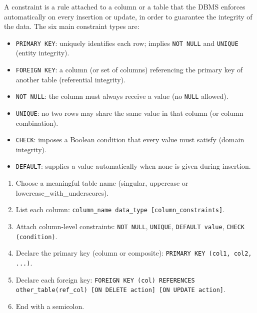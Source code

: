 \documentclass[11pt]{article}
\newcommand{\cle}[1]{{\popxbold\color{popdark}#1}}
\begin{document}
\begin{definition}[Constraint]
A \cle{constraint} is a rule attached to a column or a table that the DBMS enforces automatically on every insertion or update, in order to guarantee the integrity of the data. The six main constraint types are:
\begin{itemize}
\item \texttt{PRIMARY KEY}: uniquely identifies each row; implies \texttt{NOT NULL} and \texttt{UNIQUE} (entity integrity).
\item \texttt{FOREIGN KEY}: a column (or set of columns) referencing the primary key of another table (referential integrity).
\item \texttt{NOT NULL}: the column must always receive a value (no \texttt{NULL} allowed).
\item \texttt{UNIQUE}: no two rows may share the same value in that column (or column combination).
\item \texttt{CHECK}: imposes a Boolean condition that every value must satisfy (domain integrity).
\item \texttt{DEFAULT}: supplies a value automatically when none is given during insertion.
\end{itemize}
\end{definition}

\begin{methode}
\begin{enumerate}
\item Choose a meaningful table name (singular, uppercase or lowercase\_with\_underscores).
\item List each column: \texttt{column\_name data\_type [column\_constraints]}.
\item Attach column-level constraints: \texttt{NOT NULL}, \texttt{UNIQUE}, \texttt{DEFAULT value}, \texttt{CHECK (condition)}.
\item Declare the primary key (column or composite): \texttt{PRIMARY KEY (col1, col2, ...)}.
\item Declare each foreign key: \texttt{FOREIGN KEY (col) REFERENCES other\_table(ref\_col) [ON DELETE action] [ON UPDATE action]}.
\item End with a semicolon.
\end{enumerate}
\end{methode}
\end{document}

